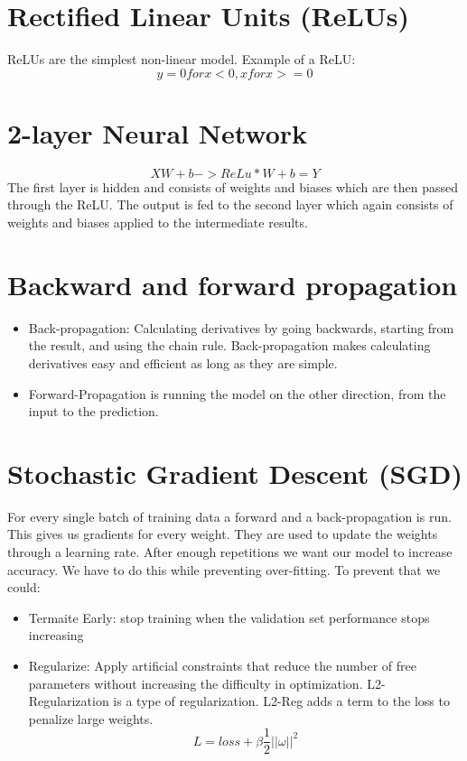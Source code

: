 \documentclass{article}
\begin{document}
	\section{Rectified Linear Units (ReLUs)}
	ReLUs are the simplest non-linear model. Example of a ReLU:
	\begin{equation}
	y = {0 for x<0, x for x>=0}
	\end{equation}
	\section{2-layer Neural Network}
	\begin{equation}
	XW + b -> ReLu *W + b = Y
	\end{equation}
	The first layer is hidden and consists of weights and biases which are then passed through the ReLU. The output is fed to the second layer which again consists of weights and biases applied to the intermediate results.
	\section{Backward and forward propagation}
	\begin{itemize}
		\item Back-propagation: Calculating derivatives by going backwards, starting from the result, and using the chain rule. Back-propagation makes calculating derivatives easy and efficient as long as they are simple.
		\item Forward-Propagation is running the model on the other direction, from the input to the prediction.
	\end{itemize}
\section{Stochastic Gradient Descent (SGD)}
	For every single batch of training data a forward and a back-propagation is run. This gives us gradients for every weight. They are used to update the weights through a learning rate. After enough repetitions we want our model to increase accuracy. We have to do this while preventing over-fitting. To prevent that we could:
	\begin{itemize}
		\item Termaite Early: stop training when the validation set performance stops increasing
		\item Regularize: Apply artificial constraints that reduce the number of free parameters without increasing the difficulty in optimization. L2-Regularization is a type of regularization. L2-Reg adds a term to the loss to penalize large weights.
		\begin{equation}
			L = loss + \beta \frac{1}{2}||\omega||^2
		\end{equation}
	\end{itemize}
\end{document}
